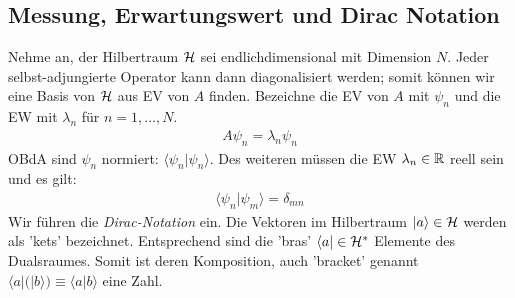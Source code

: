 \subsection{Messung, Erwartungswert und Dirac Notation}

Nehme an, der Hilbertraum $\mathcal{H}$ sei endlichdimensional mit Dimension $N$. Jeder
selbst-adjungierte Operator kann dann diagonalisiert werden; somit können wir
eine Basis von $\mathcal{H}$ aus EV von $A$ finden. Bezeichne die EV von $A$ mit
$\psi_n$ und die EW mit $\lambda_n$ für $n = 1,\dots,N$.
\begin{align*}
    A \psi_n = \lambda_n \psi_n
\end{align*}
OBdA sind $\psi_n$ normiert: $\langle \psi_n | \psi_n \rangle$. Des weiteren
müssen die EW $\lambda_n \in \mathbb{R}$ reell sein und es gilt:
\begin{align*}
    \langle \psi_n | \psi_m \rangle = \delta_{mn}
\end{align*}
Wir führen die \textit{Dirac-Notation} ein. Die Vektoren im Hilbertraum $ | a \rangle
\in \mathcal{H}$ werden als 'kets' bezeichnet. Entsprechend sind die 'bras'
$\langle a | \in \mathcal{H}^\ast$ Elemente des Dualsraumes. Somit ist deren Komposition,
auch 'bracket' genannt $\langle a | (|b \rangle) \equiv \langle a | b \rangle$
eine Zahl.

